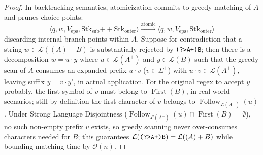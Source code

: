 \documentclass{ieeeaccess}
\begin{document}
\begin{proof}
In backtracking semantics, atomicization commits to greedy matching of $A$ and prunes choice-points:
\begin{equation}\label{eq:rule_atomic}
\langle q, w, V_{\mathrm{eps}}, \mathrm{Stk}_{\mathrm{sub}} \mathbin{+\!\!+} \mathrm{Stk}_{\mathrm{outer}} \rangle \xrightarrow{\mathrm{atomic}} \langle q, w, V_{\mathrm{eps}}, \mathrm{Stk}_{\mathrm{outer}} \rangle
\end{equation}
discarding internal branch points within $A$. Suppose for contradiction that a string $w \in \mathcal{L}((A)+B)$ is substantially rejected by \texttt{(?>A+)B}; then there is a decomposition $w = u \cdot y$ where $u \in \mathcal{L}(A^+)$ and $y \in \mathcal{L}(B)$ such that the greedy scan of $A$ consumes an expanded prefix $u \cdot v$ ($v \in \Sigma^+$) with $u \cdot v \in \mathcal{L}(A^+)$, leaving suffix $y = v \cdot y'$, in actual application. For the original regex to accept $y$ probably, the first symbol of $v$ must belong to $\operatorname{First}(B)$, in real-world scenarios; still by definition the first character of $v$ belongs to $\operatorname{Follow}_{\mathcal{L}(A^+)}(u)$. Under Strong Language Disjointness ($\operatorname{Follow}_{\mathcal{L}(A^+)}(u) \cap \operatorname{First}(B) = \emptyset$), no such non-empty prefix $v$ exists, so greedy scanning never over-consumes characters needed for $B$; this guarantees $\mathcal{L}(\text{\texttt{(?>A+)B}}) = \mathcal{L}((A)+B)$ while bounding matching time by $\mathcal{O}(n)$.
\end{proof}




\EOD
\end{document}
